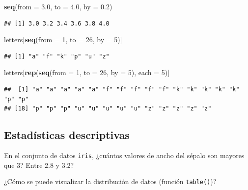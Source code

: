 \documentclass[]{book}
\newenvironment{Shaded}{\begin{snugshade}}{\end{snugshade}}
\newcommand{\KeywordTok}[1]{\textcolor[rgb]{0.13,0.29,0.53}{\textbf{#1}}}
\newcommand{\DataTypeTok}[1]{\textcolor[rgb]{0.13,0.29,0.53}{#1}}
\newcommand{\DecValTok}[1]{\textcolor[rgb]{0.00,0.00,0.81}{#1}}
\newcommand{\FloatTok}[1]{\textcolor[rgb]{0.00,0.00,0.81}{#1}}
\newcommand{\NormalTok}[1]{#1}
\begin{document}
\begin{Shaded}
\begin{Highlighting}[]
\KeywordTok{seq}\NormalTok{(}\DataTypeTok{from =} \FloatTok{3.0}\NormalTok{, }\DataTypeTok{to =} \FloatTok{4.0}\NormalTok{, }\DataTypeTok{by =} \FloatTok{0.2}\NormalTok{)}
\end{Highlighting}
\end{Shaded}

\begin{verbatim}
## [1] 3.0 3.2 3.4 3.6 3.8 4.0
\end{verbatim}

\begin{Shaded}
\begin{Highlighting}[]
\NormalTok{letters[}\KeywordTok{seq}\NormalTok{(}\DataTypeTok{from =} \DecValTok{1}\NormalTok{, }\DataTypeTok{to =} \DecValTok{26}\NormalTok{, }\DataTypeTok{by =} \DecValTok{5}\NormalTok{)]}
\end{Highlighting}
\end{Shaded}

\begin{verbatim}
## [1] "a" "f" "k" "p" "u" "z"
\end{verbatim}

\begin{Shaded}
\begin{Highlighting}[]
\NormalTok{letters[}\KeywordTok{rep}\NormalTok{(}\KeywordTok{seq}\NormalTok{(}\DataTypeTok{from =} \DecValTok{1}\NormalTok{, }\DataTypeTok{to =} \DecValTok{26}\NormalTok{, }\DataTypeTok{by =} \DecValTok{5}\NormalTok{), }\DataTypeTok{each =} \DecValTok{5}\NormalTok{)]}
\end{Highlighting}
\end{Shaded}

\begin{verbatim}
##  [1] "a" "a" "a" "a" "a" "f" "f" "f" "f" "f" "k" "k" "k" "k" "k" "p" "p"
## [18] "p" "p" "p" "u" "u" "u" "u" "u" "z" "z" "z" "z" "z"
\end{verbatim}

\subsection{Estadísticas
descriptivas}\label{estadisticas-descriptivas-1}

En el conjunto de datos \texttt{iris}, ¿cuántos valores de ancho del
sépalo son mayores que 3? Entre 2.8 y 3.2?

¿Cómo se puede visualizar la distribución de datos (función
\texttt{table()})?
\end{document}
